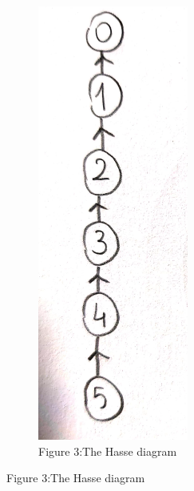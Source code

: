 \documentclass[a4 paper]{article}
\numberwithin{equation}{section}
\newcommand{\0}{\mathbf{0}}
\begin{document}
\begin{figure}[h!]
  \centering
  \begin{subfigure}[b]{0.2\linewidth}
    \includegraphics[width=\linewidth]{fig3.png}
    \caption{Figure 3:The Hasse diagram}
  \end{subfigure}
\end{figure}
\end{document}
